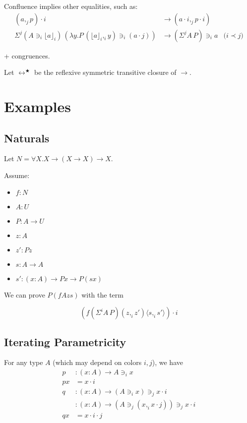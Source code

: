 \documentclass[10pt,a4paper]{article}
\newcommand\CP[3]{(#2,_{#1} #3)}
\newcommand\param[1]{\!\cdot\!#1}
\newcommand\op[1]{∋_{#1}}
\newcommand\ip[3]{Σ^{#1} {#2}\,{#3}}
\newcommand\fp[3]{⟨#2 ,_{#1} #3⟩}
\newcommand\proj[2]{⌊{#2}⌋_{#1}}
\begin{document}
Confluence implies other equalities, such as:
\begin{align*}
  {(a,_j p)} \param i &→ (a \param i ,_j p \param i)\\
  \ip j {(A \op i {\proj i a})} {(λy. P \, \CP i {\proj i a} y \op i {(a \param j)})} &→ {(\ip j A P)} \op i a &\text{($i \prec j$)}
\end{align*}

+ congruences.

\begin{definition}[Conversion]
  Let $↔^★$ be the reflexive symmetric transitive closure of $→$.
\end{definition}


\section{Examples}

\subsection{Naturals}
Let $N = ∀X. X → (X → X) → X$.

Assume:
\begin{itemize}
\item $f : N$
\item $A : U$
\item $P : A → U$
\item $z : A$
\item $z' : P z$
\item $s : A → A$
\item $s' : (x:A) → P x → P (s x)$
\end{itemize}

We can prove $P (f A z s)$ with the term

\[
(f (\ip i A P) \CP i z {z'} \fp i s {s'}) \param i
\]

\subsection{Iterating Parametricity}
For any type $A$ (which may depend on colors $i,j$), we have
\begin{align*}
p &: (x:A) → A \op i x\\
p x &= x\param i\\
q &: (x:A) → (A \op i x) \op j x \param  i\\
  &: (x:A) → (A \op j \CP i x {x \param j}) \op j x \param  i\\
q x &= x\param i\param j
\end{align*}
\end{document}
